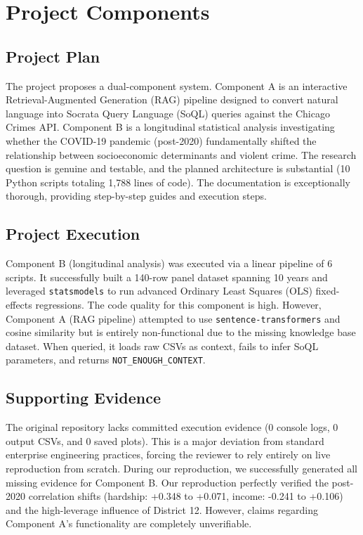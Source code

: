 \documentclass[12pt]{article}
\begin{document}
\section{Project Components}

\subsection{Project Plan}
The project proposes a dual-component system. Component A is an interactive Retrieval-Augmented Generation (RAG) pipeline designed to convert natural language into Socrata Query Language (SoQL) queries against the Chicago Crimes API. Component B is a longitudinal statistical analysis investigating whether the COVID-19 pandemic (post-2020) fundamentally shifted the relationship between socioeconomic determinants and violent crime. The research question is genuine and testable, and the planned architecture is substantial (10 Python scripts totaling 1,788 lines of code). The documentation is exceptionally thorough, providing step-by-step guides and execution steps.

\subsection{Project Execution}
Component B (longitudinal analysis) was executed via a linear pipeline of 6 scripts. It successfully built a 140-row panel dataset spanning 10 years and leveraged \texttt{statsmodels} to run advanced Ordinary Least Squares (OLS) fixed-effects regressions. The code quality for this component is high. However, Component A (RAG pipeline) attempted to use \texttt{sentence-transformers} and cosine similarity but is entirely non-functional due to the missing knowledge base dataset. When queried, it loads raw CSVs as context, fails to infer SoQL parameters, and returns \texttt{NOT\_ENOUGH\_CONTEXT}.

\subsection{Supporting Evidence}
The original repository lacks committed execution evidence (0 console logs, 0 output CSVs, and 0 saved plots). This is a major deviation from standard enterprise engineering practices, forcing the reviewer to rely entirely on live reproduction from scratch. During our reproduction, we successfully generated all missing evidence for Component B. Our reproduction perfectly verified the post-2020 correlation shifts (hardship: +0.348 to +0.071, income: -0.241 to +0.106) and the high-leverage influence of District 12. However, claims regarding Component A's functionality are completely unverifiable.
\end{document}
